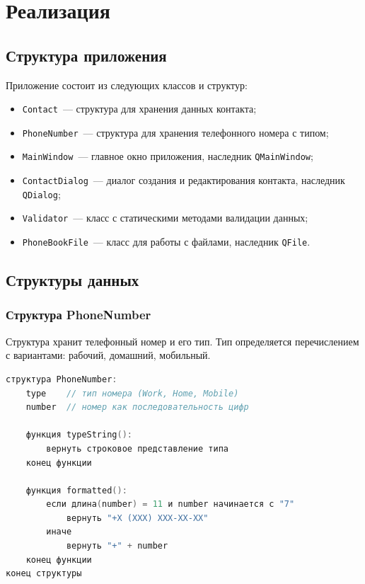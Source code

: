 \section{Реализация}

\subsection{Структура приложения}

Приложение состоит из следующих классов и структур:

\begin{itemize}
    \item \texttt{Contact}~--- структура для хранения данных контакта;
    \item \texttt{PhoneNumber}~--- структура для хранения телефонного номера с типом;
    \item \texttt{MainWindow}~--- главное окно приложения, наследник \texttt{QMainWindow};
    \item \texttt{ContactDialog}~--- диалог создания и редактирования контакта, наследник \texttt{QDialog};
    \item \texttt{Validator}~--- класс с статическими методами валидации данных;
    \item \texttt{PhoneBookFile}~--- класс для работы с файлами, наследник \texttt{QFile}.
\end{itemize}

\subsection{Структуры данных}

\subsubsection*{Структура PhoneNumber}

Структура хранит телефонный номер и его тип. Тип определяется перечислением с вариантами: рабочий, домашний, мобильный.

\begin{lstlisting}[language=C, caption=Структура PhoneNumber]
структура PhoneNumber:
    type    // тип номера (Work, Home, Mobile)
    number  // номер как последовательность цифр
    
    функция typeString():
        вернуть строковое представление типа
    конец функции
    
    функция formatted():
        если длина(number) = 11 и number начинается с "7"
            вернуть "+X (XXX) XXX-XX-XX"
        иначе
            вернуть "+" + number
    конец функции
конец структуры
\end{lstlisting}

